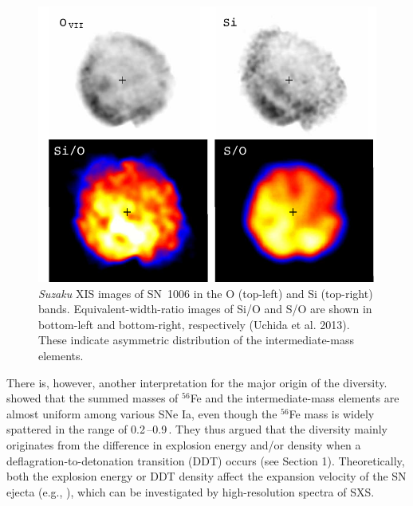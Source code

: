 \documentclass[11pt,a4paper]{article}
\begin{document}
{\begin{figure}
  \begin{center}
     \includegraphics[scale=0.8]{image_sn1006_suzaku}
  \caption{{\it Suzaku} XIS images of SN~1006 in the O (top-left) and Si
    (top-right) bands.  Equivalent-width-ratio images of Si/O and S/O
    are shown in bottom-left and bottom-right, respectively (Uchida et al. 2013). These
    indicate asymmetric distribution of the intermediate-mass
    elements.  }
  \label{sn1006:suzaku}
  \end{center}
\end{figure}


There is, however, another interpretation for the major origin of the
diversity. \citet{mazzali07} showed that the summed masses of
$^{56}$Fe and the intermediate-mass elements are almost uniform among
various SNe Ia, even though the $^{56}$Fe mass is widely spattered in
the range of 0.2\,\msun--0.9\,\msun.  They thus argued that the
diversity mainly originates from the difference in explosion energy
and/or density when a deflagration-to-detonation transition (DDT)
occurs (see Section 1). Theoretically, both the explosion energy or
DDT density affect the expansion velocity of the SN ejecta (e.g.,
\citealt{iwamoto99}), which can be investigated by high-resolution
spectra of SXS.


}
\end{document}
